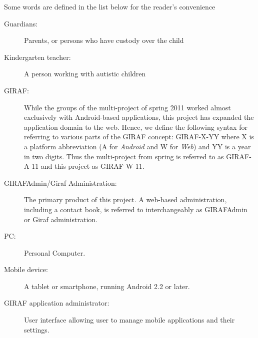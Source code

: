 Some words are defined in the list below for the reader's convenience
\begin{description}
\item[Guardians:] Parents, or persons who have custody over the child
\item[Kindergarten teacher:] A person working with autistic children
\item[GIRAF:] While the groups of the multi-project of spring 2011 worked almost exclusively with Android-based applications, this project has expanded the application domain to the web. Hence, we define the following syntax for referring to various parts of the GIRAF concept: GIRAF-X-YY where X is a platform abbreviation (A for \emph{Android} and W for \emph{Web}) and YY is a year in two digits. Thus the multi-project from spring is referred to as GIRAF-A-11 and this project as GIRAF-W-11.
\item[GIRAFAdmin/Giraf Administration:] The primary product of this project. A web-based administration, including a contact book, is referred to interchangeably as GIRAFAdmin or Giraf administration.
\item[PC:] Personal Computer.
\item[Mobile device:] A tablet or smartphone, running Android 2.2 or later.
\item[GIRAF application administrator:] User interface allowing user to manage mobile applications and their settings.
\end{description}


